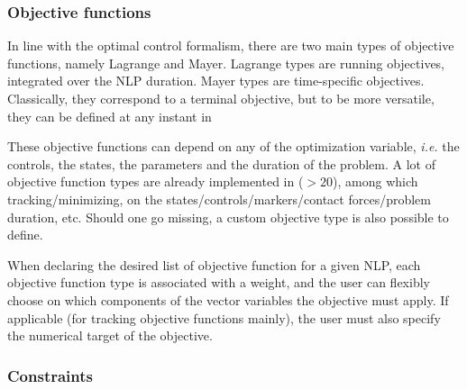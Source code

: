 \subsubsection{Objective functions}
In line with the optimal control formalism, there are two main types of objective functions, namely Lagrange and Mayer. Lagrange types are running objectives, integrated over the NLP duration. Mayer types are time-specific objectives. Classically, they correspond to a terminal objective, but to be more versatile, they can be defined at any instant in \bioptim{}

These objective functions can depend on any of the optimization variable, \textit{i.e.} the controls, the states, the parameters and the duration of the problem. A lot of objective function types are already implemented in \bioptim ($>\!20$), among which tracking/minimizing, on the states/controls/markers/contact forces/problem duration, etc. Should one go missing, a custom objective type is also possible to define.

When declaring the desired list of objective function for a given NLP, each objective function type is associated with a weight, and the user can flexibly choose on which components of the vector variables the objective must apply. If applicable (for tracking objective functions mainly), the user must also specify the numerical target of the objective.

\subsubsection{Constraints}

